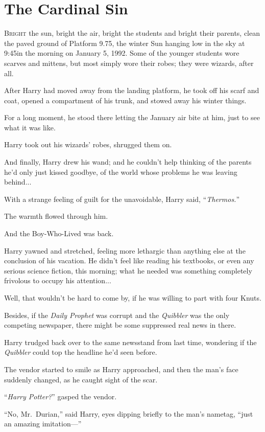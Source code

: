 \chapter{The Cardinal Sin}

\lettrine{B}{right} the sun, bright the air, bright the students and bright their parents, clean the paved ground of Platform 9.75, the winter Sun hanging low in the sky at 9:45\AM in the morning on January 5\Th, 1992. Some of the younger students wore scarves and mittens, but most simply wore their robes; they were wizards, after all.

After Harry had moved away from the landing platform, he took off his scarf and coat, opened a compartment of his trunk, and stowed away his winter things.

For a long moment, he stood there letting the January air bite at him, just to see what it was like.

Harry took out his wizards’ robes, shrugged them on.

And finally, Harry drew his wand; and he couldn’t help thinking of the parents he’d only just kissed goodbye, of the world whose problems he was leaving behind...

With a strange feeling of guilt for the unavoidable, Harry said, “\emph{Thermos.}”

The warmth flowed through him.

And the Boy-Who-Lived was back.

Harry yawned and stretched, feeling more lethargic than anything else at the conclusion of his vacation. He didn’t feel like reading his textbooks, or even any serious science fiction, this morning; what he needed was something completely frivolous to occupy his attention...

Well, that wouldn’t be hard to come by, if he was willing to part with four Knuts.

Besides, if the \emph{Daily Prophet} was corrupt and the \emph{Quibbler} was the only competing newspaper, there might be some suppressed real news in there.

Harry trudged back over to the same newsstand from last time, wondering if the \emph{Quibbler} could top the headline he’d seen before.

The vendor started to smile as Harry approached, and then the man’s face suddenly changed, as he caught sight of the scar.

“\emph{Harry Potter?}” gasped the vendor.

“No, Mr.~Durian,” said Harry, eyes dipping briefly to the man’s nametag, “just an amazing imitation—”

